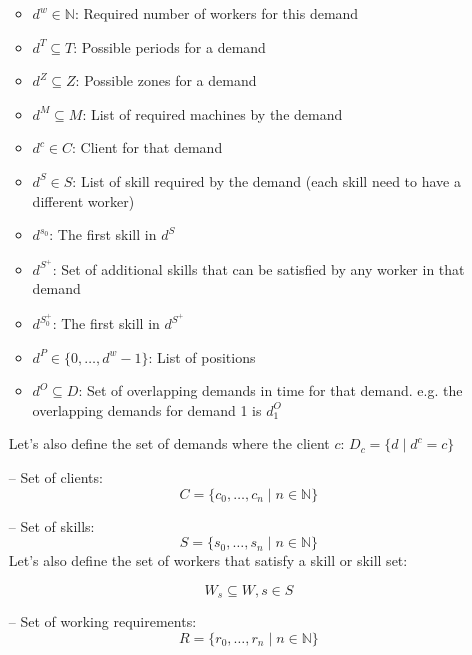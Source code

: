 \documentclass[../../thesis.tex]{subfiles}
\begin{document}
\begin{itemize}
  \begin{itemize}
    \item $d^w \in \mathbb{N}$: Required number of workers for this demand
    \item $d^T \subseteq T$: Possible periods for a demand
    \item $d^Z \subseteq Z$: Possible zones for a demand
    \item $d^M \subseteq M$: List of required machines by the demand
    \item $d^c \in C$: Client for that demand
    \item $d^S \in S$: List of skill required by the demand (each skill need to have a different worker)
    \item $d^{s_0}$: The first skill in $d^S$
    \item $d^{S^+}$: Set of additional skills that can be satisfied by any worker in that demand
    \item $d^{S^+_0}$: The first skill in $d^{S^+}$
    \item $d^P \in \{ 0, \dots, d^w - 1 \}$: List of positions
    \item $d^O \subseteq D$: Set of overlapping demands in time for that demand. e.g. the overlapping demands for demand 1 is $d_1^O$
  \end{itemize} 

  Let's also define the set of demands where the client $c$: ${D_c = \{ d \mid d^c = c \}}$

  \item[--] Set of clients: 
  \begin{equation*}
      C = \{ c_0, \dots, c_n \mid n \in \mathbb{N} \}
  \end{equation*}

  \item[--] Set of skills: 
  \begin{equation*}
      S = \{ s_0, \dots, s_n \mid n \in \mathbb{N} \}
  \end{equation*}
  Let's also define the set of workers that satisfy a skill or skill set:
  
  \begin{equation*}
      W_s \subseteq W, s \in S
  \end{equation*}

  \item[--] Set of working requirements: 
  \begin{equation*}
      R = \{ r_0, \dots, r_n \mid n \in \mathbb{N} \}
  \end{equation*}


\end{itemize}
\end{document}
